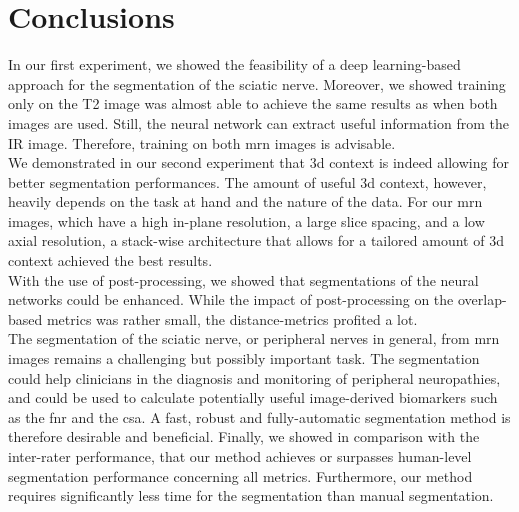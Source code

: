 \section{Conclusions} \label{disc:conclusions}
In our first experiment, we showed the feasibility of a deep learning-based approach for the segmentation of the sciatic nerve. Moreover, we showed training only on the T2 image was almost able to achieve the same results as when both images are used. Still, the neural network can extract useful information from the IR image. Therefore, training on both \gls{mrn} images is advisable.\\
We demonstrated in our second experiment that \gls{3d} context is indeed allowing for better segmentation performances. The amount of useful \gls{3d} context, however, heavily depends on the task at hand and the nature of the data. For our \gls{mrn} images, which have a high in-plane resolution, a large slice spacing, and a low axial resolution, a stack-wise architecture that allows for a tailored amount of \gls{3d} context achieved the best results.\\
With the use of post-processing, we showed that segmentations of the neural networks could be enhanced. While the impact of post-processing on the overlap-based metrics was rather small, the distance-metrics profited a lot.\\
The segmentation of the sciatic nerve, or peripheral nerves in general, from \gls{mrn} images remains a challenging but possibly important task. The segmentation could help clinicians in the diagnosis and monitoring of peripheral neuropathies, and could be used to calculate potentially useful image-derived biomarkers such as the \gls{fnr} and the \gls{csa}. A fast, robust and fully-automatic segmentation method is therefore desirable and beneficial. Finally, we showed in comparison with the inter-rater performance, that our method achieves or surpasses human-level segmentation performance concerning all metrics. Furthermore, our method requires significantly less time for the segmentation than manual segmentation.

\endinput